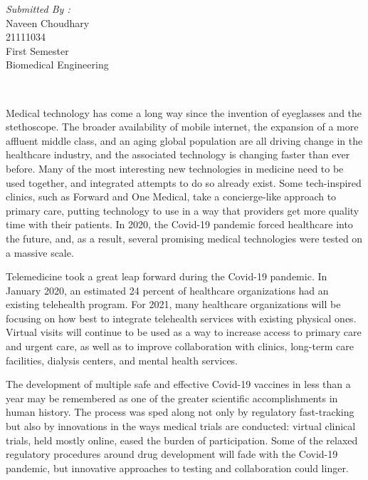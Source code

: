 \documentclass[12pt]{article}
\begin{document}
\begin{titlepage}
\begin{minipage}{0.4\textwidth}
			\begin{flushright} \large
			\emph{Submitted By :} \\
			Naveen Choudhary\\
            21111034\\
        First Semester\\
        Biomedical Engineering\\
		\end{flushright}
        
	\end{minipage}\\[2 cm]
	

\end{titlepage}

\newpage

Medical technology has come a long way since the invention of eyeglasses and the stethoscope. The broader availability of mobile internet, the expansion of a more affluent middle class, and an aging global population are all driving change in the healthcare industry, and the associated technology is changing faster than ever before. Many of the most interesting new technologies in medicine need to be used together, and integrated attempts to do so already exist. Some tech-inspired clinics, such as Forward and One Medical, take a concierge-like approach to primary care, putting technology to use in a way that providers get more quality time with their patients. In 2020, the Covid-19 pandemic forced healthcare into the future, and, as a result, several promising medical technologies were tested on a massive scale. 

\indent

Telemedicine took a great leap forward during the Covid-19 pandemic. In January 2020, an estimated 24 percent of healthcare organizations had an existing telehealth program. For 2021, many healthcare organizations will be focusing on how best to integrate telehealth services with existing physical ones. Virtual visits will continue to be used as a way to increase access to primary care and urgent care, as well as to improve collaboration with clinics, long-term care facilities, dialysis centers, and mental health services. 

\indent

The development of multiple safe and effective Covid-19 vaccines in less than a year may be remembered as one of the greater scientific accomplishments in human history. The process was sped along not only by regulatory fast-tracking but also by innovations in the ways medical trials are conducted: virtual clinical trials, held mostly online, eased the burden of participation. Some of the relaxed regulatory procedures around drug development will fade with the Covid-19 pandemic, but innovative approaches to testing and collaboration could linger.
\end{document}
